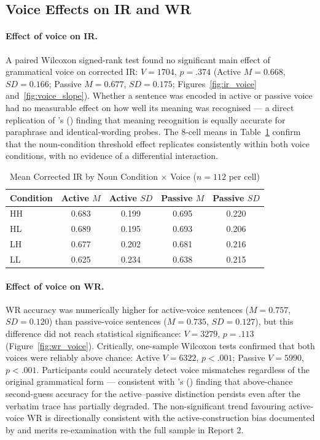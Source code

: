 \documentclass[12pt, a4paper]{article}
\begin{document}
\subsection{Voice Effects on IR and WR}

\paragraph{Effect of voice on IR.}
A paired Wilcoxon signed-rank test found no significant main effect of
grammatical voice on corrected IR: $V = 1704$, $p = .374$ (Active $M = 0.668$,
$SD = 0.166$; Passive $M = 0.677$, $SD = 0.175$; Figures~\ref{fig:ir_voice}
and~\ref{fig:voice_slope}). Whether a sentence was encoded in active or passive
voice had no measurable effect on how well its meaning was recognised — a direct
replication of \citeauthor{begg1971}'s (\citeyear{begg1971}) finding that meaning
recognition is equally accurate for paraphrase and identical-wording probes.
The 8-cell means in Table~\ref{tab:8cell} confirm that the noun-condition
threshold effect replicates consistently within both voice conditions, with no
evidence of a differential interaction.

\begin{table}[H]
\centering
\caption{Mean Corrected IR by Noun Condition $\times$ Voice ($n = 112$ per cell)}
\label{tab:8cell}
\begin{tabular}{@{}lcccc@{}}
\toprule
Condition & Active $M$ & Active $SD$ & Passive $M$ & Passive $SD$ \\ \midrule
HH & 0.683 & 0.199 & 0.695 & 0.220 \\
HL & 0.689 & 0.195 & 0.693 & 0.206 \\
LH & 0.677 & 0.202 & 0.681 & 0.216 \\
LL & 0.625 & 0.234 & 0.638 & 0.215 \\ \bottomrule
\end{tabular}
\end{table}

\paragraph{Effect of voice on WR.}
WR accuracy was numerically higher for active-voice sentences ($M = 0.757$,
$SD = 0.120$) than passive-voice sentences ($M = 0.735$, $SD = 0.127$), but
this difference did not reach statistical significance: $V = 3279$, $p = .113$
(Figure~\ref{fig:wr_voice}). Critically, one-sample Wilcoxon tests confirmed
that both voices were reliably above chance: Active $V = 6322$, $p < .001$;
Passive $V = 5990$, $p < .001$. Participants could accurately detect voice
mismatches regardless of the original grammatical form — consistent with
\citeauthor{bregman1968}'s (\citeyear{bregman1968}) finding that above-chance
second-guess accuracy for the active--passive distinction persists even after
the verbatim trace has partially degraded. The non-significant trend favouring
active-voice WR is directionally consistent with the active-construction bias
documented by \citet{james1973} and merits re-examination with the full sample
in Report 2.
\end{document}
